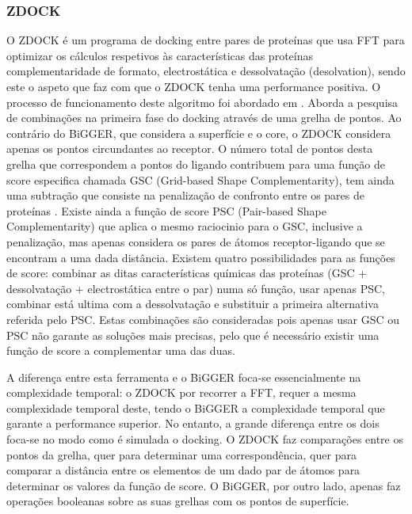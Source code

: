 \subsubsection{ZDOCK}
O ZDOCK é um programa de docking entre pares de proteínas que usa FFT para optimizar os cálculos respetivos às características das proteínas complementaridade de formato, electrostática e dessolvatação (desolvation), sendo este o aspeto que faz com que o ZDOCK tenha uma performance positiva. O processo de funcionamento deste algoritmo foi abordado em \cite{zdock}.
Aborda a pesquisa de combinações na primeira fase do docking através de uma grelha de pontos. Ao contrário do BiGGER, que considera a superfície e o core, o ZDOCK considera apenas os pontos circundantes ao receptor. O número total de pontos desta grelha que correspondem a pontos do ligando contribuem para uma função de score especifica chamada GSC (Grid-based Shape Complementarity), tem ainda uma subtração que consiste na penalização de confronto entre os pares de proteínas \cite{chen2002docking}. Existe ainda a função de score PSC (Pair-based Shape Complementarity) que aplica o mesmo raciocinio para o GSC, inclusive a penalização, mas apenas considera os pares de átomos receptor-ligando que se encontram a uma dada distância.
Existem quatro possibilidades para as funções de score: combinar as ditas características químicas das proteínas (GSC + dessolvatação + electrostática  entre o par) numa só função, usar apenas PSC, combinar está ultima com a dessolvatação e substituir a primeira alternativa referida pelo PSC. Estas combinações são consideradas pois apenas usar GSC ou PSC não garante as soluções mais precisas, pelo que é necessário existir uma função de score a complementar uma das duas. \par
A diferença entre esta ferramenta e o BiGGER foca-se essencialmente na complexidade temporal: o ZDOCK por recorrer a FFT, requer a mesma complexidade temporal deste, tendo o BiGGER a complexidade temporal que garante a performance superior.
No entanto, a grande diferença entre os dois foca-se no modo como é simulada o docking. O ZDOCK faz comparações entre os pontos da grelha, quer para determinar uma correspondência, quer para comparar a distância entre os elementos de um dado par de átomos  para determinar os valores da função de score. O BiGGER, por outro lado, apenas faz operações booleanas sobre as suas grelhas com os pontos de superfície.  


